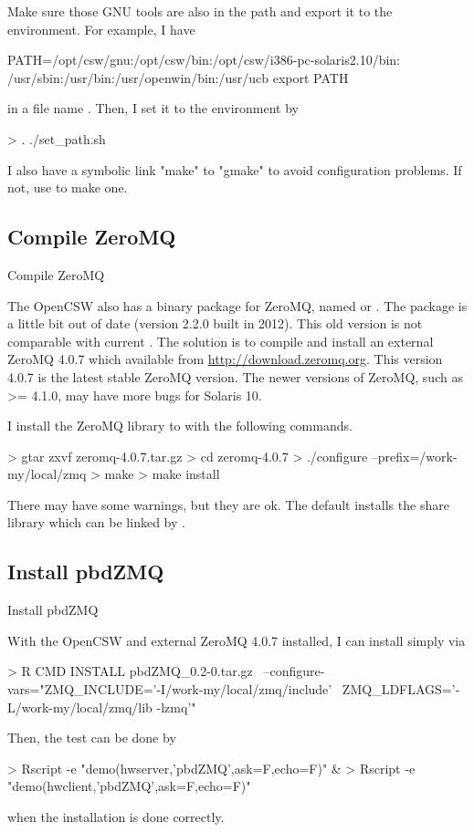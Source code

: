 Make sure those GNU tools are also in the path and export it to
the environment. For example, I have
\begin{Code}
PATH=/opt/csw/gnu:/opt/csw/bin:/opt/csw/i386-pc-solaris2.10/bin:
/usr/sbin:/usr/bin:/usr/openwin/bin:/usr/ucb
export PATH
\end{Code}
in a file name . Then, I set it to the environment by
\begin{Code}
> . ./set_path.sh
\end{Code}
I also have a symbolic link "make" to "gmake" to avoid configuration problems.
If not, use  to make one.


\subsection{Compile ZeroMQ}{Compile ZeroMQ}
\label{sec:compile_zeromq}
The OpenCSW also has a binary package for ZeroMQ, named  or
.
The package is a little bit out of date (version 2.2.0 built in 2012).
This old version is not comparable with current .
The solution is to compile and install an external ZeroMQ 4.0.7
which available from \url{http://download.zeromq.org}.
This version 4.0.7 is the latest stable ZeroMQ version.
The newer versions of ZeroMQ, such as >= 4.1.0, may have more bugs
for Solaris 10.

I install the ZeroMQ library to  with
the following commands.
\begin{Code}
> gtar zxvf zeromq-4.0.7.tar.gz
> cd zeromq-4.0.7
> ./configure --prefix=/work-my/local/zmq 
> make
> make install
\end{Code}
There may have some warnings, but they are ok. The default installs
the share library which can be linked by .


\subsection{Install pbdZMQ}{Install pbdZMQ}
\label{sec:install_pbdzmq}
With the OpenCSW and external ZeroMQ 4.0.7 installed, I can install
 simply via
\begin{Code}
> R CMD INSTALL pbdZMQ_0.2-0.tar.gz \
  --configure-vars="ZMQ_INCLUDE='-I/work-my/local/zmq/include' \
                    ZMQ_LDFLAGS='-L/work-my/local/zmq/lib -lzmq'"
\end{Code}
Then, the test can be done by
\begin{Code}
> Rscript -e "demo(hwserver,'pbdZMQ',ask=F,echo=F)" &
> Rscript -e "demo(hwclient,'pbdZMQ',ask=F,echo=F)"
\end{Code}
when the  installation is done correctly.

